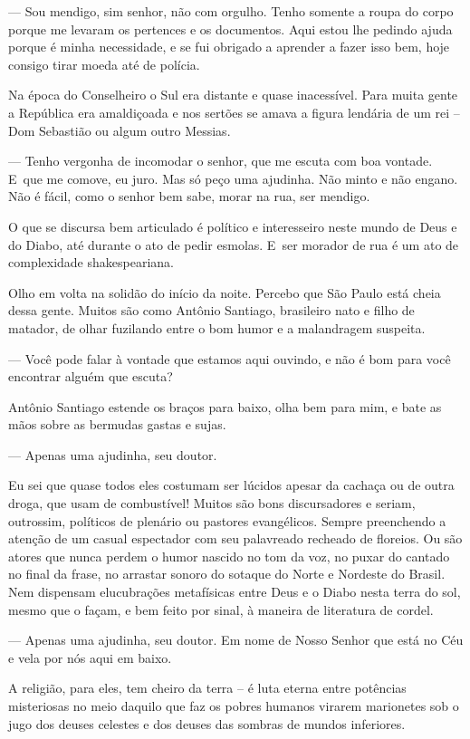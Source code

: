 — Sou mendigo, sim senhor, não com orgulho. Tenho somente a roupa do
corpo porque me levaram os pertences e os documentos. Aqui estou lhe
pedindo ajuda porque é minha necessidade, e se fui obrigado a aprender a
fazer isso bem, hoje consigo tirar moeda até de polícia.

Na época do Conselheiro o Sul era distante e quase inacessível. Para
muita gente a República era amaldiçoada e nos sertões se amava a figura
lendária de um rei -- Dom Sebastião ou algum outro Messias.

— Tenho vergonha de incomodar o senhor, que me escuta com boa vontade. E~que me comove, eu juro. Mas só peço uma ajudinha. Não minto e não
engano. Não é fácil, como o senhor bem sabe, morar na rua, ser mendigo.

O que se discursa bem articulado é político e interesseiro neste mundo
de Deus e do Diabo, até durante o ato de pedir esmolas. E~ser morador de
rua é um ato de complexidade shakespeariana.

\asterisc{}

Olho em volta na solidão do início da noite. Percebo que São Paulo está
cheia dessa gente. Muitos são como Antônio Santiago, brasileiro nato e
filho de matador, de olhar fuzilando entre o bom humor e a malandragem
suspeita.

— Você pode falar à vontade que estamos aqui ouvindo, e não é bom para
você encontrar alguém que escuta?

Antônio Santiago estende os braços para baixo, olha bem para mim, e bate
as mãos sobre as bermudas gastas e sujas.

— Apenas uma ajudinha, seu doutor.

Eu sei que quase todos eles costumam ser lúcidos apesar da cachaça ou de
outra droga, que usam de combustível! Muitos são bons discursadores e
seriam, outrossim, políticos de plenário ou pastores evangélicos. Sempre
preenchendo a atenção de um casual espectador com seu palavreado
recheado de floreios. Ou são atores que nunca perdem o humor nascido no
tom da voz, no puxar do cantado no final da frase, no arrastar sonoro do
sotaque do Norte e Nordeste do Brasil. Nem dispensam elucubrações
metafísicas entre Deus e o Diabo nesta terra do sol, mesmo que o façam,
e bem feito por sinal, à maneira de literatura de cordel.

— Apenas uma ajudinha, seu doutor. Em nome de Nosso Senhor que está no
Céu e vela por nós aqui em baixo.

A religião, para eles, tem cheiro da terra -- é luta eterna entre
potências misteriosas no meio daquilo que faz os pobres humanos virarem
marionetes sob o jugo dos deuses celestes e dos deuses das sombras de
mundos inferiores.

